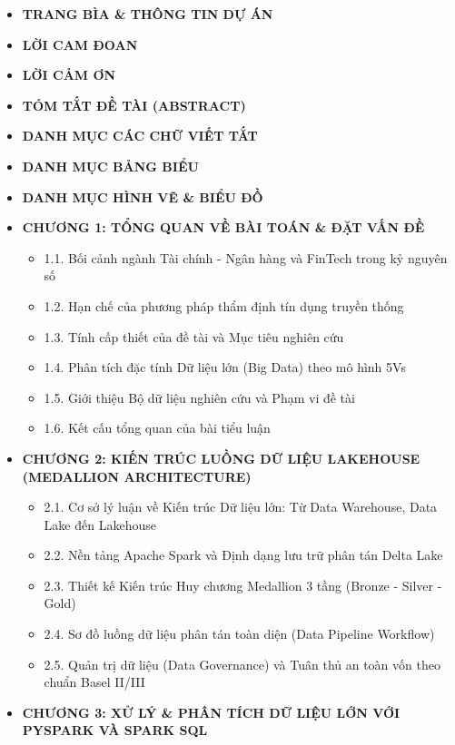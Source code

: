 \documentclass[
  13pt,
  a4paper,
]{report}
\providecommand{\tightlist}{%
  \setlength{\itemsep}{0pt}\setlength{\parskip}{0pt}}
\begin{document}
\begin{itemize}
\tightlist
\item
  \textbf{TRANG BÌA \& THÔNG TIN DỰ ÁN}
\item
  \textbf{LỜI CAM ĐOAN}
\item
  \textbf{LỜI CẢM ƠN}
\item
  \textbf{TÓM TẮT ĐỀ TÀI (ABSTRACT)}
\item
  \textbf{DANH MỤC CÁC CHỮ VIẾT TẮT}
\item
  \textbf{DANH MỤC BẢNG BIỂU}
\item
  \textbf{DANH MỤC HÌNH VẼ \& BIỂU ĐỒ}
\item
  \textbf{CHƯƠNG 1: TỔNG QUAN VỀ BÀI TOÁN \& ĐẶT VẤN ĐỀ}

  \begin{itemize}
  \tightlist
  \item
    1.1. Bối cảnh ngành Tài chính - Ngân hàng và FinTech trong kỷ nguyên
    số
  \item
    1.2. Hạn chế của phương pháp thẩm định tín dụng truyền thống
  \item
    1.3. Tính cấp thiết của đề tài và Mục tiêu nghiên cứu
  \item
    1.4. Phân tích đặc tính Dữ liệu lớn (Big Data) theo mô hình 5Vs
  \item
    1.5. Giới thiệu Bộ dữ liệu nghiên cứu và Phạm vi đề tài
  \item
    1.6. Kết cấu tổng quan của bài tiểu luận
  \end{itemize}
\item
  \textbf{CHƯƠNG 2: KIẾN TRÚC LUỒNG DỮ LIỆU LAKEHOUSE (MEDALLION
  ARCHITECTURE)}

  \begin{itemize}
  \tightlist
  \item
    2.1. Cơ sở lý luận về Kiến trúc Dữ liệu lớn: Từ Data Warehouse, Data
    Lake đến Lakehouse
  \item
    2.2. Nền tảng Apache Spark và Định dạng lưu trữ phân tán Delta Lake
  \item
    2.3. Thiết kế Kiến trúc Huy chương Medallion 3 tầng (Bronze - Silver
    - Gold)
  \item
    2.4. Sơ đồ luồng dữ liệu phân tán toàn diện (Data Pipeline Workflow)
  \item
    2.5. Quản trị dữ liệu (Data Governance) và Tuân thủ an toàn vốn theo
    chuẩn Basel II/III
  \end{itemize}
\item
  \textbf{CHƯƠNG 3: XỬ LÝ \& PHÂN TÍCH DỮ LIỆU LỚN VỚI PYSPARK VÀ SPARK
  SQL}


\end{itemize}
\end{document}
